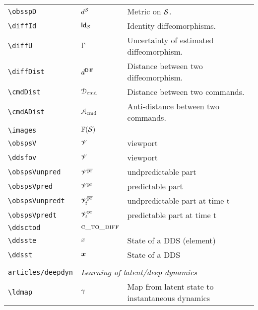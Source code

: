 \begin{longtable}{lll}
 {\color[rgb]{0.5,0.5,0.5}\texttt{\textbackslash obsspD}} & $\obsspD$ &  Metric on $\obsps$.\\ 
 {\color[rgb]{0.5,0.5,0.5}\texttt{\textbackslash diffId}} & $\diffId$ &  Identity diffeomorphisms.\\ 
 {\color[rgb]{0.5,0.5,0.5}\texttt{\textbackslash diffU}} & $\Gamma$ &  Uncertainty of estimated diffeomorphism.\\ 
 {\color[rgb]{0.5,0.5,0.5}\texttt{\textbackslash diffDist}} & $d^{\mathsf{Diff}}$ &  Distance between two diffeomorphism.\\ 
 {\color[rgb]{0.5,0.5,0.5}\texttt{\textbackslash cmdDist}} & $\mathcal{D}_{\text{cmd}}$ &  Distance between two commands.\\ 
 {\color[rgb]{0.5,0.5,0.5}\texttt{\textbackslash cmdADist}} & $\mathcal{A}_{\text{cmd}}$ &  Anti-distance between two commands.\\ 
 {\color[rgb]{0.5,0.5,0.5}\texttt{\textbackslash images}} & $\images$ & \\ 
 {\color[rgb]{0.5,0.5,0.5}\texttt{\textbackslash obspsV}} & $\mathscr{V}$ &  viewport\\ 
 {\color[rgb]{0.5,0.5,0.5}\texttt{\textbackslash ddsfov}} & $\mathscr{V}$ &  viewport\\ 
 {\color[rgb]{0.5,0.5,0.5}\texttt{\textbackslash obspsVunpred}} & $\mathscr{V}^{\overline{\text{pr}}}$ &  undpredictable part\\ 
 {\color[rgb]{0.5,0.5,0.5}\texttt{\textbackslash obspsVpred}} & $\mathscr{V}^\text{pr}$ &  predictable part \\ 
 {\color[rgb]{0.5,0.5,0.5}\texttt{\textbackslash obspsVunpredt}} & $\mathscr{V}_t^{\overline{\text{pr}}}$ &  undpredictable part at time t\\ 
 {\color[rgb]{0.5,0.5,0.5}\texttt{\textbackslash obspsVpredt}} & $\mathscr{V}_t^\text{pr}$ &  predictable part at time t\\ 
 {\color[rgb]{0.5,0.5,0.5}\texttt{\textbackslash ddsctod}} & $\textsc{c\_to\_diff}$ & \\ 
 {\color[rgb]{0.5,0.5,0.5}\texttt{\textbackslash ddsste}} & $x$ &  State of a DDS (element)\\ 
 {\color[rgb]{0.5,0.5,0.5}\texttt{\textbackslash ddsst}} & $\boldsymbol{x}$ &  State of a DDS\\ 
  &  & \\ 
 {\color[rgb]{0.5,0.5,0.5}\texttt{articles/deepdyn}} & \multicolumn{2}{l}{\emph{Learning of latent/deep dynamics}}\\ 
 \hline
{\color[rgb]{0.5,0.5,0.5}\texttt{\textbackslash ldmap}} & $\gamma$ &  Map from latent state to instantaneous dynamics\\ 

\end{longtable}
